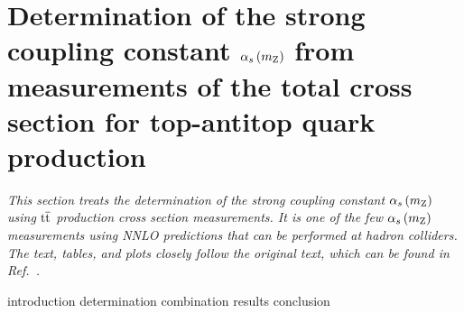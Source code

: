 \section{Determination of the strong coupling constant \texorpdfstring{$\alpha_s \left( m_\mathrm{Z} \right) $}{alphas(mZ)} from measurements of the total cross section for top-antitop quark production}

\emph{%
This section treats the determination of the strong coupling constant $\alpha_s \left( m_\mathrm{Z} \right) $ using $\mathrm{t}\overline{\mathrm{t}}$ production cross section measurements.
% 
It is one of the few $\alpha_s \left( m_\mathrm{Z} \right) $ measurements using NNLO predictions that can be performed at hadron colliders.
% 
The text, tables, and plots closely follow the original text, which can be found in Ref.~\cite{Klijnsma:2017eqp}.
}

{introduction}
{determination}
{combination}
{results}
{conclusion}

